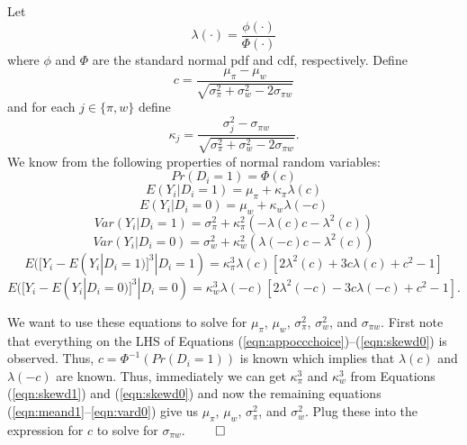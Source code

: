 \documentclass[12 pt]{article}
\begin{document}
Let
\begin{equation*}
	\lambda(\cdot) = \frac{\phi(\cdot)}{\Phi(\cdot)}
\end{equation*}
where $\phi$ and $\Phi$ are the standard normal pdf and cdf, respectively. Define 
	\begin{equation*}
	c = \frac{\mu_\pi - \mu_w}{\sqrt{\sigma_\pi^2 + \sigma_w^2 - 2\sigma_{\pi w}}}
\end{equation*} and for each $j\in\{\pi,w\}$ define
\begin{equation*}
	\kappa_j = \frac{\sigma^2_j-\sigma_{\pi w}}{\sqrt{\sigma_\pi^2+\sigma_w^2-2\sigma_{\pi w}}}.
\end{equation*}
We know from \citet{heckman1990empirical} the following properties of normal random variables:
\begin{equation}
	Pr(D_i = 1) = \Phi(c)
	\label{eqn:appoccchoice}
\end{equation}
\begin{equation}
	E(Y_i | D_i = 1) = \mu_\pi + \kappa_\pi \lambda(c)
	\label{eqn:meand1}
\end{equation}
\begin{equation}
	E(Y_i | D_i = 0) = \mu_w + \kappa_w \lambda(-c)
	\label{eqn:meand0}
\end{equation}
\begin{equation}
	Var(Y_i | D_i = 1) = \sigma_\pi^2 + \kappa_\pi^2(-\lambda(c)c - \lambda^2(c))
	\label{eqn:vard1}
\end{equation}
\begin{equation}
	Var(Y_i | D_i = 0) = \sigma_w^2 + \kappa_w^2(\lambda(-c)c - \lambda^2(c))
	\label{eqn:vard0}
\end{equation}
\begin{equation}
	E([Y_i - E(Y_i|D_i = 1)]^3|D_i = 1) = \kappa_\pi^3 \lambda(c)[2\lambda^2(c) + 3 c \lambda(c) + c^2 -1]
	\label{eqn:skewd1}
\end{equation}
\begin{equation}
	E([Y_i - E(Y_i|D_i = 0)]^3|D_i = 0) = \kappa_w^3 \lambda(-c)[2\lambda^2(-c) - 3 c \lambda(-c) + c^2 -1].
	\label{eqn:skewd0}
\end{equation}

We want to use these equations to solve for $\mu_\pi$, $\mu_w$, $\sigma_\pi^2$, $\sigma_w^2$, and $\sigma_{\pi w}$. First note that everything on the LHS of Equations (\ref{eqn:appoccchoice})--(\ref{eqn:skewd0}) is observed. Thus, $c=\Phi^{-1}(Pr(D_i = 1))$ is known which implies that $\lambda(c)$ and $\lambda(-c)$ are known. Thus, immediately we can get $\kappa_\pi^3$ and $ \kappa_w^3$ from Equations (\ref{eqn:skewd1}) and (\ref{eqn:skewd0}) and now the remaining equations (\ref{eqn:meand1}--\ref{eqn:vard0}) give us $\mu_\pi$, $\mu_w$, $\sigma_\pi^2$, and $\sigma_w^2$. Plug these into the expression for $c$ to solve for $\sigma_{\pi w}$. $\qed$
\end{document}
